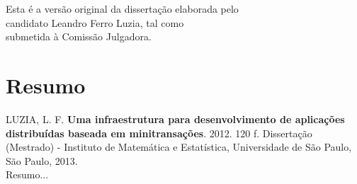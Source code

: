 \documentclass[11pt,twoside,a4paper]{book}
\begin{document}
    \vskip 2cm

    \begin{flushright}
	Esta é a versão original da dissertação elaborada pelo\\
	candidato Leandro Ferro Luzia, tal como \\
	submetida à Comissão Julgadora.
    \end{flushright}

\pagebreak



\chapter*{Resumo}

\noindent LUZIA, L. F. \textbf{Uma infraestrutura para desenvolvimento de aplicações distribuídas baseada em minitransações}. 
2012. 120 f.
Dissertação (Mestrado) - Instituto de Matemática e Estatística,
Universidade de São Paulo, São Paulo, 2013.
\\

Resumo...
\\
\end{document}
